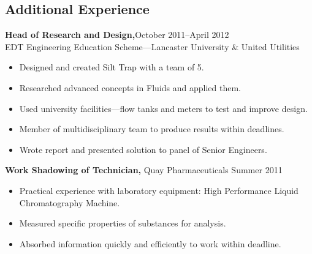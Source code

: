 \documentclass[margin]{res}
\begin{document}
\begin{resume}
  \section{Additional Experience}
 {\bf Head of Research and Design,}\hfill October 2011--April 2012\\ EDT Engineering Education Scheme---Lancaster University \& United Utilities 
 \begin{itemize} \itemsep -2pt  %
 \item Designed and created Silt Trap with a team of 5.
\item Researched advanced concepts in Fluids and applied them.
\item Used university facilities---flow tanks and meters to test and improve design.
\item Member of multidisciplinary team to produce results within deadlines.
 \item Wrote report and presented solution to panel of Senior Engineers.
 
 \end{itemize}
 
{\bf Work Shadowing of Technician,} Quay Pharmaceuticals \hfill  Summer 2011
\begin{itemize} \itemsep -2pt %
\item Practical experience with laboratory equipment: High Performance Liquid Chromatography Machine.
\item Measured specific properties of substances for analysis.
\item Absorbed information quickly and efficiently to work within deadline.
\end{itemize}




\end{resume}
\end{document}
